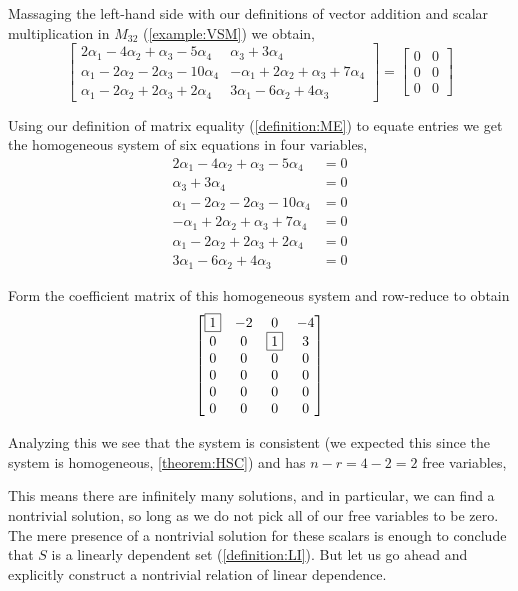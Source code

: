 \documentclass{ximera}
\begin{document}
\begin{example}
  Massaging the left-hand side with our definitions of vector addition and scalar multiplication in $M_{32}$ (\ref{example:VSM}) we obtain,
  \[
    \begin{bmatrix}
      2\alpha_1-4\alpha_2+\alpha_3-5\alpha_4&
      \alpha_3+3\alpha_4\\
      \alpha_1-2\alpha_2-2\alpha_3-10\alpha_4&
      -\alpha_1+2\alpha_2+\alpha_3+7\alpha_4\\
      \alpha_1-2\alpha_2+2\alpha_3+2\alpha_4&
      3\alpha_1-6\alpha_2+4\alpha_3
    \end{bmatrix}
    =\begin{bmatrix}
      0&0\\0&0\\0&0
    \end{bmatrix}
  \]

  Using our definition of matrix equality (\ref{definition:ME}) to equate entries we get the homogeneous system of six equations in four variables,
  \begin{align*}
    2\alpha_1-4\alpha_2+\alpha_3-5\alpha_4&=0\\
    \alpha_3+3\alpha_4&=0\\
    \alpha_1-2\alpha_2-2\alpha_3-10\alpha_4&=0\\
    -\alpha_1+2\alpha_2+\alpha_3+7\alpha_4&=0\\
    \alpha_1-2\alpha_2+2\alpha_3+2\alpha_4&=0\\
    3\alpha_1-6\alpha_2+4\alpha_3         &=0
  \end{align*}

  Form the coefficient matrix of this homogeneous system and row-reduce to obtain
  \[
    \begin{bmatrix}
      \fbox{1} & -2 & 0 & -4\\
      0 & 0 & \fbox{1} & 3\\
      0 & 0 & 0 & 0\\
      0 & 0 & 0 & 0\\
      0 & 0 & 0 & 0\\
      0 & 0 & 0 & 0
    \end{bmatrix}
  \]

  Analyzing this we see that the system is consistent (we expected
  this since the system is homogeneous, \ref{theorem:HSC}) and has
  $n-r=4-2=2$ free variables, 
  \begin{mutipleChoice}
  \end{mutipleChoice}
  This means there are infinitely many solutions, and in particular,
  we can find a nontrivial solution, so long as we do not pick all of
  our free variables to be zero.  The mere presence of a nontrivial
  solution for these scalars is enough to conclude that $S$ is a
  linearly dependent set (\ref{definition:LI}).  But let us go ahead
  and explicitly construct a nontrivial relation of linear dependence.


\end{example}
\end{document}
